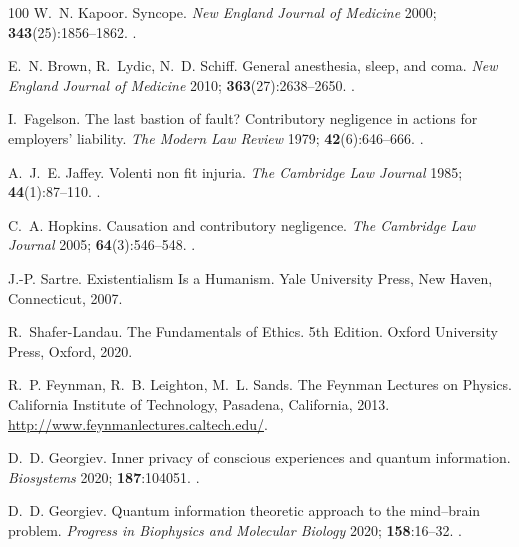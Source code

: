 \documentclass{ws-ijmpb}
\begin{document}
\begin{thebibliography}{100}
W.~N. Kapoor. Syncope. \emph{New England Journal of Medicine} 2000;
  \textbf{343}(25):1856--1862.
\newblock \href {http://doi.org/10.1056/nejm200012213432507}
  {}.

E.~N. Brown, R.~Lydic, N.~D. Schiff. General anesthesia, sleep, and coma.
  \emph{New England Journal of Medicine} 2010; \textbf{363}(27):2638--2650.
\newblock \href {http://doi.org/10.1056/nejmra0808281}
  {}.

I.~Fagelson. The last bastion of fault? {C}ontributory negligence in actions
  for employers' liability. \emph{The Modern Law Review} 1979;
  \textbf{42}(6):646--666.
\newblock \href {http://doi.org/10.1111/j.1468-2230.1979.tb01558.x}
  {}.

A.~J.~E. Jaffey. Volenti non fit injuria. \emph{The Cambridge Law Journal}
  1985; \textbf{44}(1):87--110.
\newblock \href {http://doi.org/10.1017/s000819730011445x}
  {}.

C.~A. Hopkins. Causation and contributory negligence. \emph{The Cambridge Law
  Journal} 2005; \textbf{64}(3):546--548.
\newblock \href {http://doi.org/10.1017/s0008197305296952}
  {}.

J.-P. Sartre. Existentialism Is a Humanism. Yale University Press, New Haven,
  Connecticut, 2007.

R.~Shafer-Landau. The Fundamentals of Ethics. 5th Edition. Oxford University
  Press, Oxford, 2020.

R.~P. Feynman, R.~B. Leighton, M.~L. Sands. The Feynman Lectures on Physics.
  California Institute of Technology, Pasadena, California, 2013.
\newblock \url{http://www.feynmanlectures.caltech.edu/}.

D.~D. Georgiev. Inner privacy of conscious experiences and quantum information.
  \emph{Biosystems} 2020; \textbf{187}:104051.
\newblock \href {http://doi.org/10.1016/j.biosystems.2019.104051}
  {}.

D.~D. Georgiev. Quantum information theoretic approach to the mind--brain
  problem. \emph{Progress in Biophysics and Molecular Biology} 2020;
  \textbf{158}:16--32.
\newblock \href {http://doi.org/10.1016/j.pbiomolbio.2020.08.002}
  {}.


\end{thebibliography}
\end{document}
